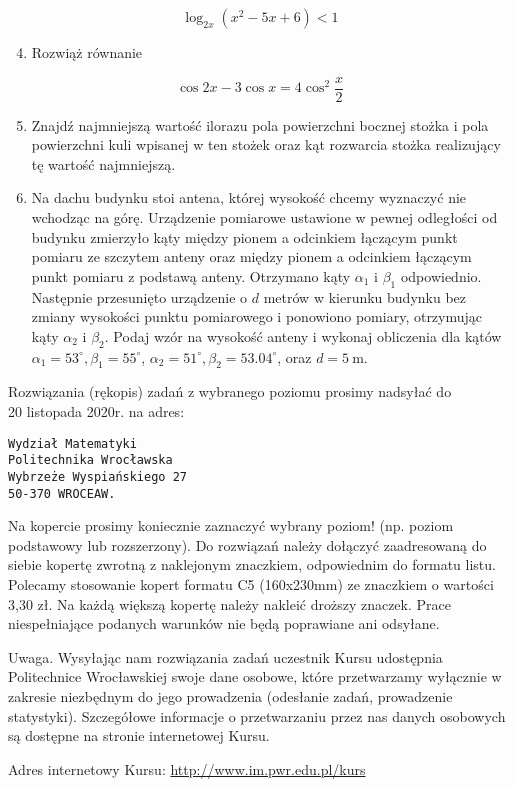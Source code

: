 \documentclass[10pt]{article}
\begin{document}
$$
\log _{2 x}\left(x^{2}-5 x+6\right)<1
$$

\begin{enumerate}
  \setcounter{enumi}{3}
  \item Rozwiąż równanie
\end{enumerate}

$$
\cos 2 x-3 \cos x=4 \cos ^{2} \frac{x}{2}
$$

\begin{enumerate}
  \setcounter{enumi}{4}
  \item Znajdź najmniejszą wartość ilorazu pola powierzchni bocznej stożka i pola powierzchni kuli wpisanej w ten stożek oraz kąt rozwarcia stożka realizujący tę wartość najmniejszą.
  \item Na dachu budynku stoi antena, której wysokość chcemy wyznaczyć nie wchodząc na górę. Urządzenie pomiarowe ustawione w pewnej odległości od budynku zmierzyło kąty między pionem a odcinkiem łączącym punkt pomiaru ze szczytem anteny oraz między pionem a odcinkiem łączącym punkt pomiaru z podstawą anteny. Otrzymano kąty $\alpha_{1}$ i $\beta_{1}$ odpowiednio. Następnie przesunięto urządzenie o $d$ metrów w kierunku budynku bez zmiany wysokości punktu pomiarowego i ponowiono pomiary, otrzymując kąty $\alpha_{2}$ i $\beta_{2}$. Podaj wzór na wysokość anteny i wykonaj obliczenia dla kątów $\alpha_{1}=53^{\circ}, \beta_{1}=55^{\circ}$, $\alpha_{2}=51^{\circ}, \beta_{2}=53.04^{\circ}$, oraz $d=5 \mathrm{~m}$.
\end{enumerate}

Rozwiązania (rękopis) zadań z wybranego poziomu prosimy nadsyłać do\\
20 listopada 2020r. na adres:

\begin{verbatim}
Wydział Matematyki
Politechnika Wrocławska
Wybrzeże Wyspiańskiego 27
50-370 WROCEAW.
\end{verbatim}

Na kopercie prosimy koniecznie zaznaczyć wybrany poziom! (np. poziom podstawowy lub rozszerzony). Do rozwiązań należy dołączyć zaadresowaną do siebie kopertę zwrotną z naklejonym znaczkiem, odpowiednim do formatu listu. Polecamy stosowanie kopert formatu C5 (160x230mm) ze znaczkiem o wartości 3,30 zł. Na każdą większą kopertę należy nakleić droższy znaczek. Prace niespełniające podanych warunków nie będą poprawiane ani odsyłane.

Uwaga. Wysyłając nam rozwiązania zadań uczestnik Kursu udostępnia Politechnice Wrocławskiej swoje dane osobowe, które przetwarzamy wyłącznie w zakresie niezbędnym do jego prowadzenia (odesłanie zadań, prowadzenie statystyki). Szczegółowe informacje o przetwarzaniu przez nas danych osobowych są dostępne na stronie internetowej Kursu.

Adres internetowy Kursu: \href{http://www.im.pwr.edu.pl/kurs}{http://www.im.pwr.edu.pl/kurs}
\end{document}
